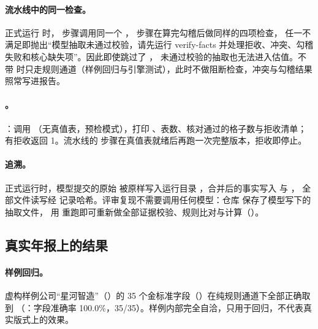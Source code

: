 \paragraph{流水线中的同一检查。}
正式运行  时， 步骤调用同一个 ， 步骤在算完勾稽后做同样的四项检查，
任一不满足即抛出“模型抽取未通过校验，请先运行 verify-facts 并处理拒收、冲突、勾稽失败和核心缺失项”。因此即使跳过了 ，
未通过校验的抽取也无法进入估值。不带  时只走规则通道（样例回归与引擎测试），此时不做阻断检查，冲突与勾稽结果照常写进报告。

\paragraph{。}
：调用 （无真值表，预检模式），打印 、表数、核对通过的格子数与拒收清单；
有拒收返回 1。流水线的  步骤在真值表就绪后再跑一次完整版本，拒收即停止。

\paragraph{追溯。}
正式运行时，模型提交的原始  被原样写入运行目录 ，合并后的事实写入  与 ，
全部文件读写经  记录哈希。评审复现不需要调用任何模型：仓库  保存了模型写下的抽取文件，
用  重跑即可重新做全部证据校验、规则比对与计算（）。

\subsection{真实年报上的结果}
\label{sec:ext-results}

\paragraph{样例回归。}
虚构样例公司“星河智造”（）的 35 个金标准字段（）在纯规则通道下全部正确取到
（：字段准确率 100.0\%，35/35）。样例内部完全自洽，只用于回归，不代表真实版式上的效果。

